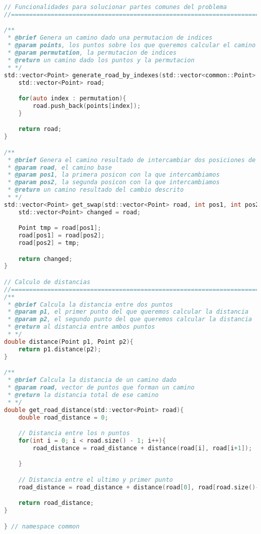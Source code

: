 \documentclass[10pt, a4paper]{article}
\theoremstyle{theorem-style}
\theoremstyle{theorem-style}
\theoremstyle{definition-style}
\theoremstyle{remark-style}
\theoremstyle{example-style}
\theoremstyle{definition-style}
\theoremstyle{remark-style}
\begin{document}
\begin{lstlisting}[language=C]
// Funcionalidades para solucionar partes comunes del problema
//==============================================================================

/**
 * @brief Genera un camino dado una permutacion de indices
 * @param points, los puntos sobre los que queremos calcular el camino
 * @param permutation, la permutacion de indices
 * @return un camino dado los puntos y la permutacion
 * */
std::vector<Point> generate_road_by_indexes(std::vector<common::Point> points, std::vector<int> permutation){
    std::vector<Point> road;

    for(auto index : permutation){
        road.push_back(points[index]);
    }

    return road;
}

/**
 * @brief Genera el camino resultado de intercambiar dos posiciones de un camino
 * @param road, el camino base
 * @param pos1, la primera posicon con la que intercambiamos
 * @param pos2, la segunda posicon con la que intercambiamos
 * @return un camino resultado del cambio descrito
 * */
std::vector<Point> get_swap(std::vector<Point> road, int pos1, int pos2){
    std::vector<Point> changed = road;

    Point tmp = road[pos1];
    road[pos1] = road[pos2];
    road[pos2] = tmp;

    return changed;
}

// Calculo de distancias
//==============================================================================
/**
 * @brief Calcula la distancia entre dos puntos
 * @param p1, el primer punto del que queremos calcular la distancia
 * @param p2, el segundo punto del que queremos calcular la distancia
 * @return al distancia entre ambos puntos
 * */
double distance(Point p1, Point p2){
    return p1.distance(p2);
}

/**
 * @brief Calcula la distancia de un camino dado
 * @param road, vector de puntos que forman un camino
 * @return la distancia total de ese camino
 * */
double get_road_distance(std::vector<Point> road){
    double road_distance = 0;

    // Distancia entre los n puntos
    for(int i = 0; i < road.size() - 1; i++){
        road_distance = road_distance + distance(road[i], road[i+1]);

    }

    // Distancia entre el ultimo y primer punto
    road_distance = road_distance + distance(road[0], road[road.size()-1]);

    return road_distance;
}

} // namespace common
\end{lstlisting}
\end{document}
